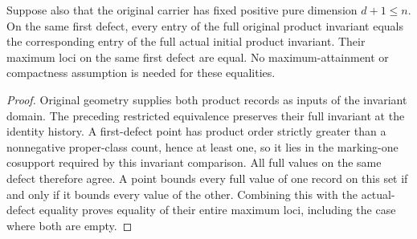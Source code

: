\begin{theorem}
\label{hir:sharp-actual-initial-full-maximum-source-equality}
Suppose also that the original carrier has fixed positive pure dimension
$d+1\leq n$. On the same first defect, every entry of the full original
product invariant equals the corresponding entry of the full actual initial
product invariant. Their maximum loci on the same first defect are equal.
No maximum-attainment or compactness assumption is needed for these
equalities.
\end{theorem}
\begin{proof}
Original geometry supplies both product records as inputs of the invariant
domain. The preceding restricted equivalence preserves their full invariant
at the identity history. A first-defect point has product order strictly
greater than a nonnegative proper-class count, hence at least one, so it lies
in the marking-one cosupport required by this invariant comparison. All full
values on the same defect therefore agree. A point bounds every full value
of one record on this set if and only if it bounds every value of the other.
Combining this with the actual-defect equality proves equality of their
entire maximum loci, including the case where both are empty.
\leanok
\end{proof}

